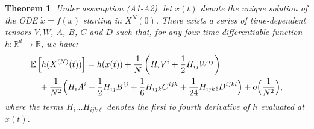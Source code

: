 \documentclass[sigconf]{acmart}
\newtheorem{theorem}{Theorem}
\newcommand\XN{X^{(N)}}
\newcommand\R{\mathbb{R}}
\newcommand\esp[1]{{\mathchoice{\besp{#1}}{\sesp{#1}}{\sesp{#1}}{\sesp{#1}}}}
\newcommand\besp[1]{\mathbb{E}\left[#1\right]}
\newcommand\sesp[1]{\mathbb{E}[#1]}
\begin{document}
\begin{theorem}
  \label{th:transient}
  Under assumption (A1-A2), let $x(t)$ denote the unique solution of
  the ODE $\dot{x}=f(x)$ starting in $X^N(0)$. There exists a series
  of time-dependent tensors $V,W$, $A$, $B$, $C$ and $D$ such that,
  for any four-time differentiable function $h:\R^d\to\R$, we have:
  \begin{align}
    \label{eq:rr_h}
    &\esp{h(\XN(t))} = h(x(t)) + \frac1N\left(H_i V^i +
      \frac12H_{ij}W^{ij}\right)\\
    \nonumber
    &\quad+\frac1{N^2}\Big(H_iA^i+\frac12H_{ij}B^{ij}+\frac16H_{ijk}C^{ijk}+\frac1{24}H_{ijk\ell}D^{ijkl}\Big)+o\Big(\frac1{N^2}\Big),
      \nonumber
  \end{align}
  where the terms $H_i\dots H_{ijk\ell}$ denotes the first to fourth
  derivative of $h$ evaluated at $x(t)$. 
  

\end{theorem}
\end{document}
